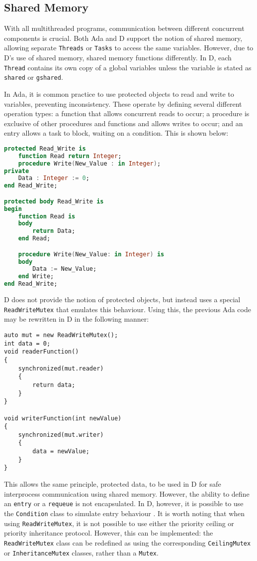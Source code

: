 \subsection{Shared Memory}
With all multithreaded programs, communication between different concurrent
components is crucial. Both Ada and D support the notion of shared memory,
allowing separate \texttt{Threads} or \texttt{Tasks} to access the same
variables. However, due to D's use of shared memory, shared memory functions
differently. In D, each \texttt{Thread} contains its own copy of a global 
variables unless the variable is stated 
as \texttt{shared} or \texttt{\textunderscore{}\textunderscore{}gshared}. 
\par\bigskip\noindent
In Ada, it is common practice to use protected objects to read and write to
variables, preventing inconsistency. These operate by defining several different 
operation types: a function that allows concurrent reads to occur; a procedure
is exclusive of other procedures and functions and allows writes to occur; 
and an entry allows a task to block, waiting on a condition. This is shown
below: 
\begin{lstlisting}[language=Ada]
protected Read_Write is
    function Read return Integer;
    procedure Write(New_Value : in Integer); 
private 
    Data : Integer := 0; 
end Read_Write;

protected body Read_Write is 
begin 
    function Read is 
    body 
        return Data; 
    end Read; 

    procedure Write(New_Value: in Integer) is 
    body
        Data := New_Value; 
    end Write; 
end Read_Write; 
\end{lstlisting}
D does not provide the notion of protected objects, but instead uses a
special \texttt{ReadWriteMutex} that emulates this behaviour.
Using this, the previous Ada code may be rewritten in D
in the following manner: 
\begin{lstlisting}
auto mut = new ReadWriteMutex(); 
int data = 0; 
void readerFunction()
{
    synchronized(mut.reader)
    {
        return data; 
    }
}

void writerFunction(int newValue)
{
    synchronized(mut.writer)
    {
        data = newValue;
    }
}
\end{lstlisting}
This allows the same principle, protected data, to be used in D for
safe interprocess communication using shared memory. However, the ability to 
define an \texttt{entry} or a \texttt{requeue} is not encapsulated. In D,
however, it is 
possible to use the \texttt{Condition} class to simulate entry behaviour 
\cite{dlang-condition}. 
It is worth noting that when using \texttt{ReadWriteMutex}, it is not possible to 
use either the priority ceiling or priority inheritance protocol.
However, this can be implemented: the \texttt{ReadWriteMutex} class
can be redefined as using the corresponding \texttt{CeilingMutex} or
\texttt{InheritanceMutex} classes, rather than a \texttt{Mutex}. 

